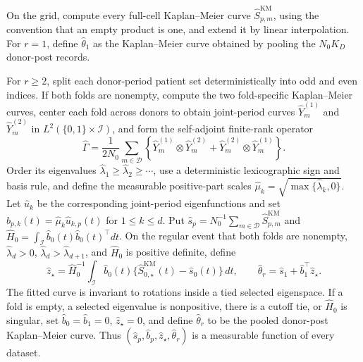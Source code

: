 On the grid, compute every full-cell Kaplan--Meier curve \(\widehat S^{\mathrm{KM}}_{p,m}\), using the convention that an empty product is one, and extend it by linear interpolation. For \(r=1\), define \(\widehat\theta_1\) as the Kaplan--Meier curve obtained by pooling the \(N_0K_D\) donor-post records.

For \(r\ge2\), split each donor-period patient set deterministically into odd and even indices. If both folds are nonempty, compute the two fold-specific Kaplan--Meier curves, center each fold across donors to obtain joint-period curves \(\widehat Y_m^{(1)}\) and \(\widehat Y_m^{(2)}\) in \(L^2(\{0,1\}\times\mathcal I)\), and form the self-adjoint finite-rank operator
\[
 \widehat\Gamma=\frac{1}{2N_0}\sum_{m\in\mathcal D}
 \left\{\widehat Y_m^{(1)}\otimes\widehat Y_m^{(2)}+
 \widehat Y_m^{(2)}\otimes\widehat Y_m^{(1)}\right\}.
\]
Order its eigenvalues \(\widehat\lambda_1\ge\widehat\lambda_2\ge\cdots\), use a deterministic lexicographic sign and basis rule, and define the measurable positive-part scales \(\widehat\mu_k=\sqrt{\max\{\widehat\lambda_k,0\}}\). Let \(\widehat u_k\) be the corresponding joint-period eigenfunctions and set \(\widehat b_{p,k}(t)=\widehat\mu_k\widehat u_{k,p}(t)\) for \(1\le k\le d\). Put \(\widehat s_p=N_0^{-1}\sum_{m\in\mathcal D}\widehat S^{\mathrm{KM}}_{p,m}\) and \(\widehat H_0=\int_{\mathcal I}\widehat b_0(t)\widehat b_0(t)^\top dt\). On the regular event that both folds are nonempty, \(\widehat\lambda_d>0\), \(\widehat\lambda_d>\widehat\lambda_{d+1}\), and \(\widehat H_0\) is positive definite, define
\[
 \widehat z_\star=\widehat H_0^{-1}\int_{\mathcal I}\widehat b_0(t)
 \{\widehat S^{\mathrm{KM}}_{0,\star}(t)-\widehat s_0(t)\}\,dt,
 \qquad
 \widehat\theta_r=\widehat s_1+\widehat b_1^\top\widehat z_\star.
\]
The fitted curve is invariant to rotations inside a tied selected eigenspace. If a fold is empty, a selected eigenvalue is nonpositive, there is a cutoff tie, or \(\widehat H_0\) is singular, set \(\widehat b_0=\widehat b_1=0\), \(\widehat z_\star=0\), and define \(\widehat\theta_r\) to be the pooled donor-post Kaplan--Meier curve. Thus \((\widehat s_p,\widehat b_p,\widehat z_\star,\widehat\theta_r)\) is a measurable function of every dataset.

